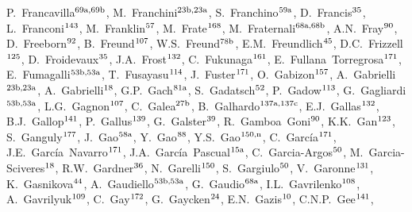 \begin{flushleft}
P.~Francavilla$^\textrm{\scriptsize 69a,69b}$,    
M.~Franchini$^\textrm{\scriptsize 23b,23a}$,    
S.~Franchino$^\textrm{\scriptsize 59a}$,    
D.~Francis$^\textrm{\scriptsize 35}$,    
L.~Franconi$^\textrm{\scriptsize 143}$,    
M.~Franklin$^\textrm{\scriptsize 57}$,    
M.~Frate$^\textrm{\scriptsize 168}$,    
M.~Fraternali$^\textrm{\scriptsize 68a,68b}$,    
A.N.~Fray$^\textrm{\scriptsize 90}$,    
D.~Freeborn$^\textrm{\scriptsize 92}$,    
B.~Freund$^\textrm{\scriptsize 107}$,    
W.S.~Freund$^\textrm{\scriptsize 78b}$,    
E.M.~Freundlich$^\textrm{\scriptsize 45}$,    
D.C.~Frizzell$^\textrm{\scriptsize 125}$,    
D.~Froidevaux$^\textrm{\scriptsize 35}$,    
J.A.~Frost$^\textrm{\scriptsize 132}$,    
C.~Fukunaga$^\textrm{\scriptsize 161}$,    
E.~Fullana~Torregrosa$^\textrm{\scriptsize 171}$,    
E.~Fumagalli$^\textrm{\scriptsize 53b,53a}$,    
T.~Fusayasu$^\textrm{\scriptsize 114}$,    
J.~Fuster$^\textrm{\scriptsize 171}$,    
O.~Gabizon$^\textrm{\scriptsize 157}$,    
A.~Gabrielli$^\textrm{\scriptsize 23b,23a}$,    
A.~Gabrielli$^\textrm{\scriptsize 18}$,    
G.P.~Gach$^\textrm{\scriptsize 81a}$,    
S.~Gadatsch$^\textrm{\scriptsize 52}$,    
P.~Gadow$^\textrm{\scriptsize 113}$,    
G.~Gagliardi$^\textrm{\scriptsize 53b,53a}$,    
L.G.~Gagnon$^\textrm{\scriptsize 107}$,    
C.~Galea$^\textrm{\scriptsize 27b}$,    
B.~Galhardo$^\textrm{\scriptsize 137a,137c}$,    
E.J.~Gallas$^\textrm{\scriptsize 132}$,    
B.J.~Gallop$^\textrm{\scriptsize 141}$,    
P.~Gallus$^\textrm{\scriptsize 139}$,    
G.~Galster$^\textrm{\scriptsize 39}$,    
R.~Gamboa~Goni$^\textrm{\scriptsize 90}$,    
K.K.~Gan$^\textrm{\scriptsize 123}$,    
S.~Ganguly$^\textrm{\scriptsize 177}$,    
J.~Gao$^\textrm{\scriptsize 58a}$,    
Y.~Gao$^\textrm{\scriptsize 88}$,    
Y.S.~Gao$^\textrm{\scriptsize 150,n}$,    
C.~Garc\'ia$^\textrm{\scriptsize 171}$,    
J.E.~Garc\'ia~Navarro$^\textrm{\scriptsize 171}$,    
J.A.~Garc\'ia~Pascual$^\textrm{\scriptsize 15a}$,    
C.~Garcia-Argos$^\textrm{\scriptsize 50}$,    
M.~Garcia-Sciveres$^\textrm{\scriptsize 18}$,    
R.W.~Gardner$^\textrm{\scriptsize 36}$,    
N.~Garelli$^\textrm{\scriptsize 150}$,    
S.~Gargiulo$^\textrm{\scriptsize 50}$,    
V.~Garonne$^\textrm{\scriptsize 131}$,    
K.~Gasnikova$^\textrm{\scriptsize 44}$,    
A.~Gaudiello$^\textrm{\scriptsize 53b,53a}$,    
G.~Gaudio$^\textrm{\scriptsize 68a}$,    
I.L.~Gavrilenko$^\textrm{\scriptsize 108}$,    
A.~Gavrilyuk$^\textrm{\scriptsize 109}$,    
C.~Gay$^\textrm{\scriptsize 172}$,    
G.~Gaycken$^\textrm{\scriptsize 24}$,    
E.N.~Gazis$^\textrm{\scriptsize 10}$,    
C.N.P.~Gee$^\textrm{\scriptsize 141}$,    

\end{flushleft}
